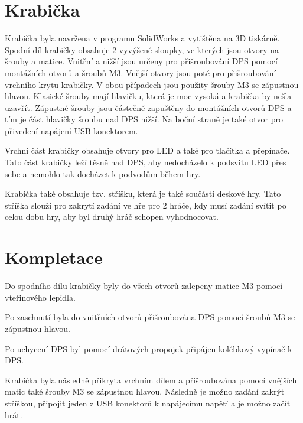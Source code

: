 \chapter{Krabička} %
Krabička byla navržena v programu SolidWorks a vytištěna na 3D tiskárně. Spodní díl krabičky obsahuje 2 vyvýšené sloupky, ve kterých jsou otvory
na šrouby a matice. Vnitřní a nižší jsou určeny pro přišroubování DPS pomocí montážních otvorů a šroubů M3. Vnější otvory jsou poté pro přišroubování 
vrchního krytu krabičky. V obou případech jsou použity šrouby M3 se zápustnou hlavou. Klasické šrouby mají hlavičku, která je moc vysoká a krabička by 
nešla uzavřít. Zápustné šrouby jsou částečně zapuštěny do montážních otvorů DPS a tím je část hlavičky šroubu nad DPS nižší. Na boční straně je také otvor
pro přivedení napájení USB konektorem.

Vrchní část krabičky obsahuje otvory pro LED a také pro tlačítka a přepínače. Tato část krabičky leží těsně nad DPS, aby nedocházelo k podsvitu LED přes
sebe a nemohlo tak docházet k podvodům během hry. 

Krabička také obsahuje tzv. stříšku, která je také součástí deskové hry. Tato stříška slouží pro zakrytí zadání ve hře pro 2 hráče, kdy 
musí zadání svítit po celou dobu hry, aby byl druhý hráč schopen vyhodnocovat. 


\chapter{Kompletace} %
Do spodního dílu krabičky byly do všech otvorů zalepeny matice M3 pomocí vteřinového lepidla. 

Po zaschnutí byla do vnitřních otvorů přišroubována DPS pomocí šroubů M3 se zápustnou hlavou. 

Po uchycení DPS byl pomocí drátových propojek připájen kolébkový vypínač k DPS.

Krabička byla následně přikryta vrchním dílem a přišroubována pomocí vnějších matic také šrouby M3 se zápustnou hlavou. Následně je možno zadání zakrýt
stříškou, připojit jeden z USB konektorů k napájecímu napětí a je možno začít hrát.  